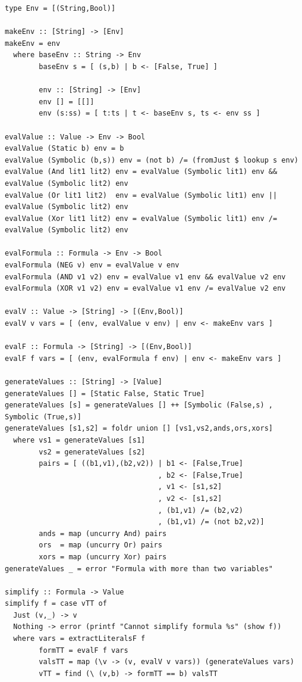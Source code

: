\documentclass{article}
\begin{document}
\begin{verbatim}
type Env = [(String,Bool)]

makeEnv :: [String] -> [Env]
makeEnv = env
  where baseEnv :: String -> Env
        baseEnv s = [ (s,b) | b <- [False, True] ]

        env :: [String] -> [Env]
        env [] = [[]]
        env (s:ss) = [ t:ts | t <- baseEnv s, ts <- env ss ]

evalValue :: Value -> Env -> Bool
evalValue (Static b) env = b
evalValue (Symbolic (b,s)) env = (not b) /= (fromJust $ lookup s env)
evalValue (And lit1 lit2) env = evalValue (Symbolic lit1) env && evalValue (Symbolic lit2) env
evalValue (Or lit1 lit2)  env = evalValue (Symbolic lit1) env || evalValue (Symbolic lit2) env
evalValue (Xor lit1 lit2) env = evalValue (Symbolic lit1) env /= evalValue (Symbolic lit2) env

evalFormula :: Formula -> Env -> Bool
evalFormula (NEG v) env = evalValue v env
evalFormula (AND v1 v2) env = evalValue v1 env && evalValue v2 env
evalFormula (XOR v1 v2) env = evalValue v1 env /= evalValue v2 env

evalV :: Value -> [String] -> [(Env,Bool)]
evalV v vars = [ (env, evalValue v env) | env <- makeEnv vars ]

evalF :: Formula -> [String] -> [(Env,Bool)]
evalF f vars = [ (env, evalFormula f env) | env <- makeEnv vars ]

generateValues :: [String] -> [Value]
generateValues [] = [Static False, Static True]
generateValues [s] = generateValues [] ++ [Symbolic (False,s) , Symbolic (True,s)] 
generateValues [s1,s2] = foldr union [] [vs1,vs2,ands,ors,xors]
  where vs1 = generateValues [s1]
        vs2 = generateValues [s2]
        pairs = [ ((b1,v1),(b2,v2)) | b1 <- [False,True]
                                    , b2 <- [False,True]
                                    , v1 <- [s1,s2]
                                    , v2 <- [s1,s2]
                                    , (b1,v1) /= (b2,v2)
                                    , (b1,v1) /= (not b2,v2)]
        ands = map (uncurry And) pairs
        ors  = map (uncurry Or) pairs
        xors = map (uncurry Xor) pairs
generateValues _ = error "Formula with more than two variables"

simplify :: Formula -> Value
simplify f = case vTT of
  Just (v,_) -> v
  Nothing -> error (printf "Cannot simplify formula %s" (show f))
  where vars = extractLiteralsF f
        formTT = evalF f vars
        valsTT = map (\v -> (v, evalV v vars)) (generateValues vars)
        vTT = find (\ (v,b) -> formTT == b) valsTT


\end{verbatim}
\end{document}
